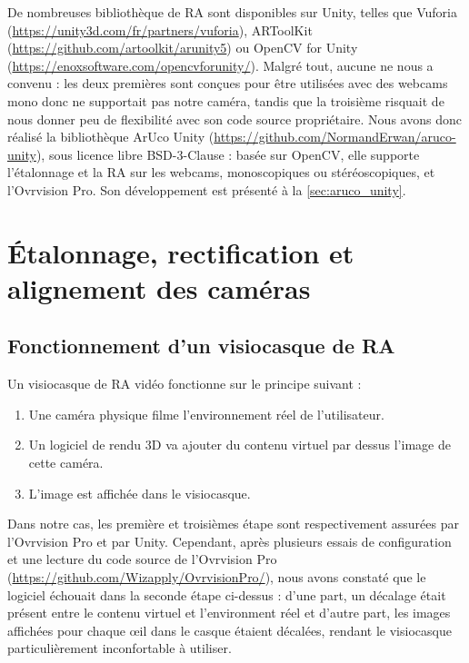 De nombreuses bibliothèque de RA sont disponibles sur Unity, telles que Vuforia (\url{https://unity3d.com/fr/partners/vuforia}), ARToolKit (\url{https://github.com/artoolkit/arunity5}) ou OpenCV for Unity (\url{https://enoxsoftware.com/opencvforunity/}). Malgré tout, aucune ne nous a convenu : les deux premières sont conçues pour être utilisées avec des webcams mono donc ne supportait pas notre caméra, tandis que la troisième risquait de nous donner peu de flexibilité avec son code source propriétaire. Nous avons donc réalisé la bibliothèque ArUco Unity (\url{https://github.com/NormandErwan/aruco-unity}), sous licence libre BSD-3-Clause : basée sur OpenCV, elle supporte l'étalonnage et la RA sur les webcams, monoscopiques ou stéréoscopiques, et l'Ovrvision Pro. Son développement est présenté à la \autoref{sec:aruco_unity}.


\section{Étalonnage, rectification et alignement des caméras}
\subsection{Fonctionnement d'un visiocasque de RA}
Un visiocasque de RA vidéo fonctionne sur le principe suivant :
\begin{enumerate}
  \item Une caméra physique filme l'environnement réel de l'utilisateur.
  \item Un logiciel de rendu 3D va ajouter du contenu virtuel par dessus l'image de cette caméra.
  \item L'image est affichée dans le visiocasque.
\end{enumerate}


Dans notre cas, les première et troisièmes étape sont respectivement assurées par l'Ovrvision Pro et par Unity. Cependant, après plusieurs essais de configuration et une lecture du code source de l'Ovrvision Pro (\url{https://github.com/Wizapply/OvrvisionPro/}), nous avons constaté que le logiciel échouait dans la seconde étape ci-dessus : d'une part, un décalage était présent entre le contenu virtuel et l'environment réel et d'autre part, les images affichées pour chaque \oe il dans le casque étaient décalées, rendant le visiocasque particulièrement inconfortable à utiliser.

